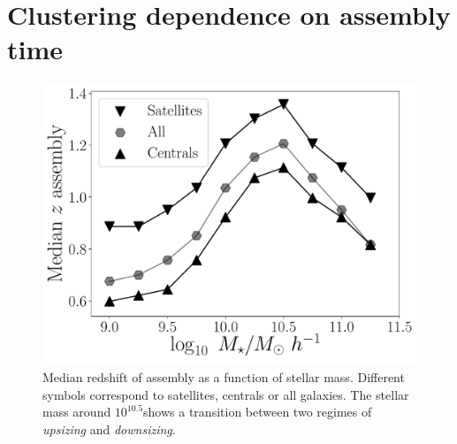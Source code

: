 \documentclass{aa}
\begin{document}
\section{Clustering dependence on assembly time}
\label{sec:results}



\begin{figure}
    \centering
    \includegraphics[width=1\columnwidth]{figuras/median_assembly.pdf}
    \caption{Median redshift of assembly as a function of stellar mass.
    Different symbols correspond to satellites, centrals or all galaxies.
    The stellar mass around $10^{10.5}$\Msunh shows a transition between two 
    regimes of \emph{upsizing} and \emph{downsizing}.}
    \label{fig:median_assembly}
\end{figure}
\end{document}
